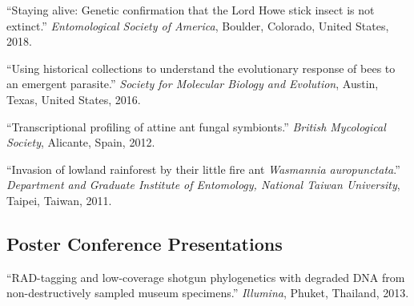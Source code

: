 \documentclass[11pt]{article}
\def\printdate#1{\xprintdate#1-}
\def\xprintdate#1-#2-#3-{#1}
\begin{document}
\ind ``Staying alive: Genetic confirmation that the Lord Howe stick insect is
not extinct.'' \emph{Entomological Society of America}, Boulder, Colorado, United States, \printdate{2018-00-00}.



\ind ``Using historical collections to understand the evolutionary response of
bees to an emergent parasite.'' \emph{Society for Molecular Biology and Evolution}, Austin, Texas, United States, \printdate{2016-00-00}.





























\ind ``Transcriptional profiling of attine ant fungal symbionts.'' \emph{British Mycological Society}, Alicante, Spain, \printdate{2012-00-00}.


\ind ``Invasion of lowland rainforest by their little fire ant
\textit{Wasmannia auropunctata}.'' \emph{Department and Graduate Institute of Entomology, National Taiwan
University}, Taipei, Taiwan, \printdate{2011-00-00}.







\subsection{Poster Conference Presentations}































\ind ``RAD-tagging and low-coverage shotgun phylogenetics with degraded DNA
from non-destructively sampled museum specimens.'' \emph{Illumina}, Phuket, Thailand, \printdate{2013-00-00}.
\end{document}
